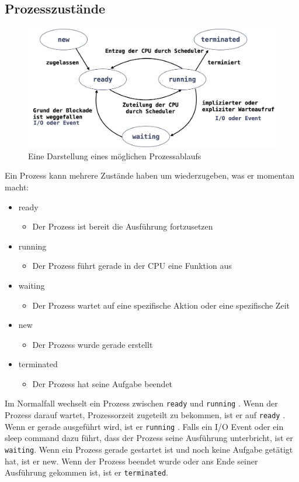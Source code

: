 \documentclass{article}
\begin{document}
	\subsection{Prozesszustände}
	\begin{figure}[H]
	\centering
	\includegraphics[scale=0.3]{Bilder/states.png}
	\caption{Eine Darstellung eines möglichen Prozessablaufs}
	\end{figure}
	
	Ein Prozess kann mehrere Zustände haben um wiederzugeben, was er momentan macht:
	\begin{itemize}
		\item{ready}
		\begin{itemize}
			\item{Der Prozess ist bereit die Ausführung fortzusetzen}
		\end{itemize}
		\item{running}
		\begin{itemize}
			\item{Der Prozess führt gerade in der CPU eine Funktion aus}
		\end{itemize}
		\item{waiting}
		\begin{itemize}
			\item{Der Prozess wartet auf eine spezifische Aktion oder eine spezifische Zeit}
		\end{itemize}
		\item{new}
		\begin{itemize}
			\item{Der Prozess wurde gerade erstellt}
		\end{itemize}
		\item{terminated}
		\begin{itemize}
			\item{Der Prozess hat seine Aufgabe beendet}
		\end{itemize}
	\end{itemize}
	Im Normalfall wechselt ein Prozess zwischen \verb|ready|  und \verb|running| . Wenn der Prozess darauf wartet, Prozessorzeit zugeteilt zu bekommen, ist er auf \verb|ready| . Wenn er gerade ausgeführt wird, ist er \verb|running| . Falls ein I/O Event oder ein sleep command dazu führt, dass der Prozess seine Ausführung unterbricht, ist er \verb|waiting|. Wenn ein Prozess gerade gestartet ist und noch keine Aufgabe getätigt hat, ist er new. Wenn der Prozess beendet wurde oder ans Ende seiner Ausführung gekommen ist, ist er \verb|terminated|. 
\end{document}
